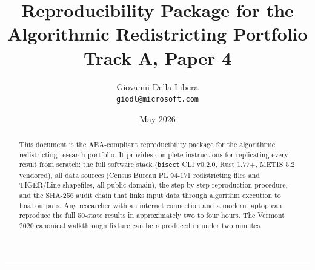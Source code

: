 \documentclass[12pt]{article}
\title{\textbf{Reproducibility Package for the\\Algorithmic Redistricting Portfolio}\\[6pt]
\large Track A, Paper 4}
\author{Giovanni Della-Libera\\
\small\texttt{giodl@microsoft.com}}
\date{May 2026}
\begin{document}
\maketitle
\thispagestyle{empty}

\begin{abstract}
\noindent
This document is the AEA-compliant reproducibility package for the
algorithmic redistricting research portfolio.
It provides complete instructions for replicating every result from scratch:
the full software stack (\texttt{bisect} CLI v0.2.0, Rust 1.77+, METIS 5.2 vendored),
all data sources (Census Bureau PL 94-171 redistricting files and TIGER/Line shapefiles,
all public domain), the step-by-step reproduction procedure, and the
SHA-256 audit chain that links input data through algorithm execution to final outputs.
Any researcher with an internet connection and a modern laptop can reproduce
the full 50-state results in approximately two to four hours.
The Vermont 2020 canonical walkthrough fixture can be reproduced in under two minutes.
\end{abstract}

\vspace{6pt}
\hrule
\vspace{6pt}

\tableofcontents

\newpage















\end{document}
